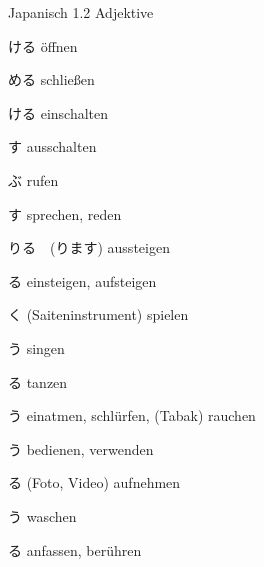 \begin{multicols*}{2}
\begin{flushleft}
\begin{labeling}{Japanisch 1.2 Adjektive}
	\item [\ruby{開}{あ}ける] öffnen
	\item [\ruby{閉}{し}める] schließen
	\item [\ruby{点}{つ}ける] einschalten
	\item [\ruby{消}{け}す] ausschalten
	
	\item [\ruby{呼}{よ}ぶ] rufen
	\item [\ruby{話}{はな}す] sprechen, reden
	
	\item [\ruby{降}{お}りる　(\ruby{降}{お}ります)] aussteigen
	\item [\ruby{乗}{の}る] einsteigen, aufsteigen
	
	\item [\ruby{弾}{ひ}く] (Saiteninstrument) spielen
	\item [\ruby{歌}{うた}う] singen
	\item [\ruby{踊}{おど}る] tanzen
	
	\item [\ruby{吸}{す}う] einatmen, schlürfen, (Tabak) rauchen
	\item [\ruby{使}{つか}う] bedienen, verwenden
	\item [\ruby{撮}{と}る] (Foto, Video) aufnehmen
	\item [\ruby{洗}{あら}う] waschen
	\item [\ruby{触}{さわ}る] anfassen, berühren
	
\end{labeling}
\end{flushleft}
\end{multicols*}
\clearpage